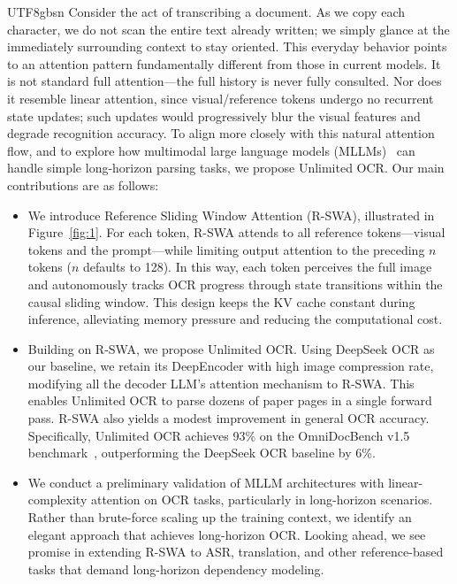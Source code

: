 \documentclass[11pt, a4paper, logo, copyright, nonumbering]{deepseek}
\begin{document}
\begin{CJK*}{UTF8}{gbsn}
Consider the act of transcribing a document. As we copy each character, we do not scan the entire text already written; we simply glance at the immediately surrounding context to stay oriented. This everyday behavior points to an attention pattern fundamentally different from those in current models. It is not standard full attention—the full history is never fully consulted. Nor does it resemble linear attention, since visual/reference tokens undergo no recurrent state updates; such updates would progressively blur the visual features and degrade recognition accuracy. To align more closely with this natural attention flow, and to explore how multimodal large language models (MLLMs)~\cite{team2023gemini,Qwen2.5-VL,huang2026step3,GPT4} can handle simple long-horizon parsing tasks, we propose Unlimited OCR. Our main contributions are as follows:


\begin{itemize}
\item We introduce Reference Sliding Window Attention (R-SWA), illustrated in Figure~\ref{fig:1}. For each token, R-SWA attends to all reference tokens—visual tokens and the prompt—while limiting output attention to the preceding $n$ tokens ($n$ defaults to 128). In this way, each token perceives the full image and autonomously tracks OCR progress through state transitions within the causal sliding window. This design keeps the KV cache constant during inference, alleviating memory pressure and reducing the computational cost. 


\item Building on R-SWA, we propose Unlimited OCR. Using DeepSeek OCR as our baseline, we retain its DeepEncoder with high image compression rate, modifying all the decoder LLM's attention mechanism to R-SWA. This enables Unlimited OCR to parse dozens of paper pages in a single forward pass. R-SWA also yields a modest improvement in general OCR accuracy. Specifically, Unlimited OCR achieves 93\% on the OmniDocBench v1.5 benchmark~\cite{ouyang2025omnidocbench}, outperforming the DeepSeek OCR baseline by 6\%.

\item We conduct a preliminary validation of MLLM architectures with linear-complexity attention on OCR tasks, particularly in long-horizon scenarios. Rather than brute-force scaling up the training context, we identify an elegant approach that achieves long-horizon OCR. Looking ahead, we see promise in extending R-SWA to ASR, translation, and other reference-based tasks that demand long-horizon dependency modeling.
\end{itemize}



\end{CJK*}
\end{document}
